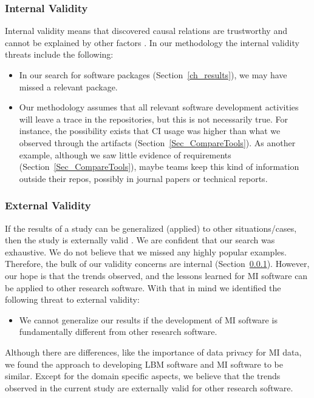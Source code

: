 \documentclass[11pt]{article}
\begin{document}
\subsubsection{Internal Validity} \label{Sec_InternalValidity}

Internal validity means that discovered causal relations are trustworthy and
cannot be explained by other factors \citep{RunesonAndHost2009}. In our
methodology the internal validity threats include the following:

\begin{itemize}
\item In our search for software packages (Section~\ref{ch_results}), we may
have missed a relevant package.
\item Our methodology assumes that all relevant software development activities
will leave a trace in the repositories, but this is not necessarily true. For
instance, the possibility exists that CI usage was higher than what we observed
through the artifacts (Section~\ref{Sec_CompareTools}). As another example,
although we saw little evidence of requirements
(Section~\ref{Sec_CompareTools}), maybe teams keep this kind of information
outside their repos, possibly in journal papers or technical reports.
\end{itemize}

\subsubsection{External Validity}

If the results of a study can be generalized (applied) to other
situations/cases, then the study is externally valid \citep{RunesonAndHost2009}.
We are confident that our search was exhaustive.  We do not believe that we
missed any highly popular examples.  Therefore, the bulk of our validity
concerns are internal (Section~\ref{Sec_InternalValidity}).
However, our hope is that the trends observed, and the lessons learned for MI
software can be applied to other research software.  With that in mind we
identified the following threat to external validity:

\begin{itemize}
\item We cannot generalize our results if the development of MI software is
fundamentally different from other research software.
\end{itemize}

Although there are differences, like the importance of data privacy for MI data,
we found the approach to developing LBM software \citep{SmithEtAl2024} and MI
software to be similar.  Except for the domain specific aspects, we believe that
the trends observed in the current study are externally valid for other research
software.
\end{document}

